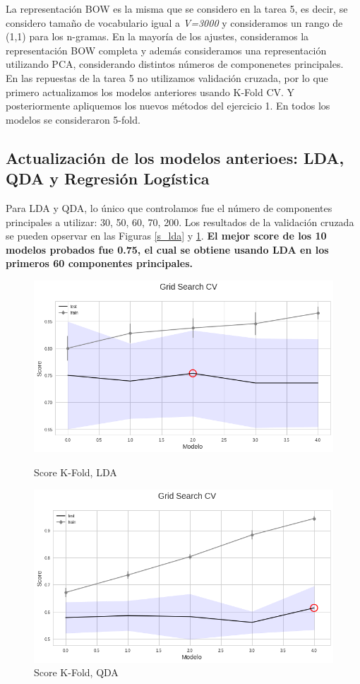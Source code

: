 \documentclass[paper=letter, fontsize=11pt]{scrartcl}
\numberwithin{equation}{section} %
\numberwithin{figure}{section} %
\numberwithin{table}{section} %
\begin{document}
La representación BOW es la misma que se considero en la tarea 5, es decir, se considero tamaño de vocabulario igual a  \textit{V=3000} y consideramos un rango de (1,1) para los n-gramas. En la mayoría de los ajustes, consideramos la representación BOW completa y además consideramos una representación utilizando PCA, considerando distintos números de componenetes principales.\\

En las repuestas de la tarea 5 no utilizamos validación cruzada, por lo que primero actualizamos los modelos anteriores usando K-Fold CV. Y posteriormente apliquemos los nuevos métodos del ejercicio 1. En todos los modelos se consideraron 5-fold. 

\subsection*{Actualización de los modelos anterioes: LDA, QDA y Regresión Logística}

Para LDA y QDA, lo único que controlamos fue el número de componentes principales a utilizar: 30, 50, 60, 70, 200. Los resultados de la validación cruzada se pueden opservar en las Figuras \ref{s_lda} y \ref{s_qda}. \textbf{El mejor score de los 10 modelos probados fue 0.75, el cual se obtiene usando LDA en los primeros 60 componentes principales.}

\begin{figure}[!htb]
  \includegraphics[width=\linewidth]{figure/s_lda_pca.png}\caption{Score K-Fold, LDA}\label{s_lda}
\endminipage\hfill
{}
  \includegraphics[width=\linewidth]{figure/s_qda_pca.png}
  \caption{Score K-Fold, QDA}\label{s_qda}
\endminipage
\end{figure}
\end{document}
